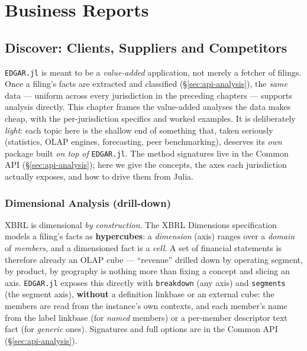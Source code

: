 \documentclass[11pt,a4paper]{report}
\begin{document}
\part{Business Reports}



\chapter{Discover: Clients, Suppliers and Competitors}
\label{ch:analysis}

\texttt{EDGAR.jl} is meant to be a \emph{value-added} application, not merely a fetcher of filings. Once a
filing's facts are extracted and classified (\S\ref{sec:api-analysis}), the \emph{same} data --- uniform
across every jurisdiction in the preceding chapters --- supports analysis directly. This chapter frames the
value-added analyses the data makes cheap, with the per-jurisdiction specifics and worked examples. It is
deliberately \emph{light}: each topic here is the shallow end of something that, taken seriously (statistics,
OLAP engines, forecasting, peer benchmarking), deserves its \emph{own} package built \emph{on top of}
\texttt{EDGAR.jl}. The method signatures live in the Common API (\S\ref{sec:api-analysis}); here we give the
concepts, the axes each jurisdiction actually exposes, and how to drive them from Julia.

\section{Dimensional Analysis (drill-down)}
\label{sec:analysis-dimensional}

XBRL is dimensional \emph{by construction}. The XBRL Dimensions specification models a filing's facts as
\textbf{hypercubes}: a \emph{dimension} (axis) ranges over a \emph{domain} of \emph{members}, and a
dimensioned fact is a \emph{cell}. A set of financial statements is therefore already an OLAP cube ---
``revenue'' drilled down by operating segment, by product, by geography is nothing more than fixing a
concept and slicing an axis. \texttt{EDGAR.jl} exposes this directly with \texttt{breakdown} (any axis) and
\texttt{segments} (the segment axis), \textbf{without} a definition linkbase or an external cube: the members
are read from the instance's own contexts, and each member's name from the label linkbase (for \emph{named}
members) or a per-member descriptor text fact (for \emph{generic} ones). Signatures and full options are in
the Common API (\S\ref{sec:api-analysis}).
\end{document}
